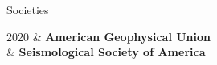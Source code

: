 \begin{rSection}{Societies}
	\begin{timeline}
		2020 & \textbf{American Geophysical Union} \\
		& \textbf{Seismological Society of America}
	\end{timeline}
\end{rSection}